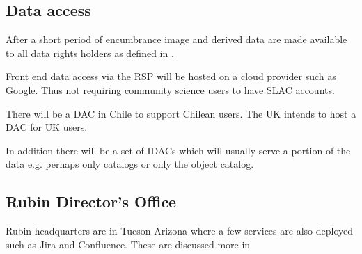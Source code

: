 \subsection{Data access}
After a short period of encumbrance image and derived data are made available to all
data rights holders as defined in .

Front end data access via the \gls{RSP} will be hosted on a \gls{cloud} provider such as Google.
Thus not requiring community science users to have \gls{SLAC} accounts.

There will  be a \gls{DAC} in Chile to support Chilean users.
The \gls{UK} intends to host a DAC for \gls{UK} users.

In addition there will be a set of \gls{IDAC}s which will usually serve a portion of the data e.g. perhaps only catalogs or only the object catalog.


\subsection{Rubin \gls{Director}'s Office}
Rubin headquarters are in Tucson Arizona where a few services are also deployed such as Jira and Confluence.
These are discussed more in 

